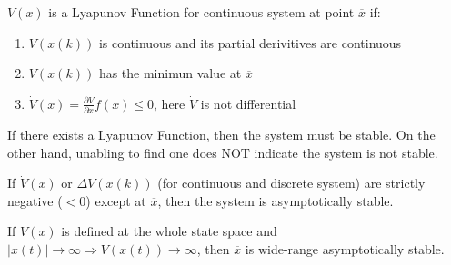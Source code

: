\documentclass{article}
\begin{document}
\begin{spacing}{1.2}
$V(x)$ is a Lyapunov Function for continuous system at point $\overline{x}$ if:

\begin{enumerate}
	\item $V(x(k))$ is continuous and its partial derivitives are continuous
	\item $V(x(k))$ has the minimun value at $\overline{x}$
	\item $\dot{V}(x)= \frac{\partial V}{\partial x} f(x) \leq 0$, here $\dot{V}$ is not differential
\end{enumerate}


If there exists a Lyapunov Function, then the system must be stable. On the other hand, unabling to find one does NOT indicate the system is not stable.

If $\dot{V}(x)$ or $\Delta V(x(k))$ (for continuous and discrete system) are strictly negative ($< 0$) except at $\overline{x}$, then the system is asymptotically stable.

If $V(x)$ is defined at the whole state space and $|x(t)| \rightarrow \infty \Rightarrow V(x(t)) \rightarrow \infty$, then $\overline{x}$ is wide-range asymptotically stable.





\end{spacing}
\end{document}
